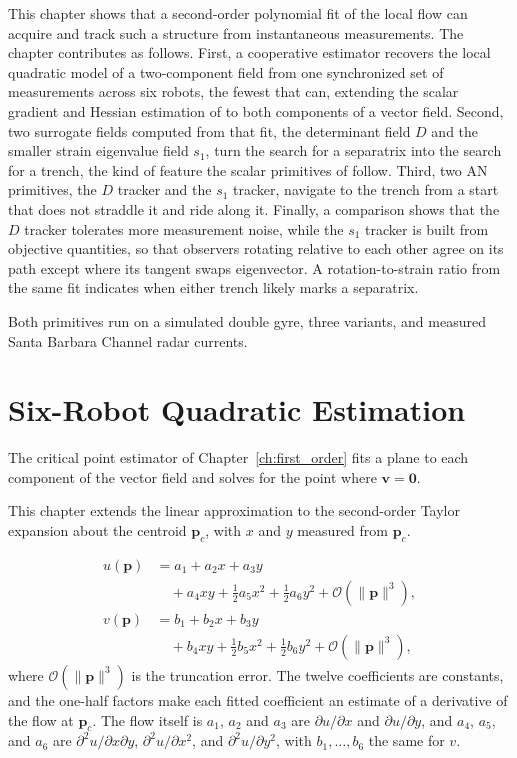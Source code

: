 This chapter shows that a second-order polynomial fit of the local flow can
acquire and track such a structure from instantaneous measurements. The
chapter contributes as follows.
First, a cooperative estimator recovers the local quadratic model of
a two-component field from one synchronized set of measurements across six
robots, the fewest that can, extending the scalar gradient and Hessian
estimation of \cite{15} to both components of a vector field. Second, two surrogate fields computed from that fit,
the determinant field $D$ and the smaller strain eigenvalue field $s_1$,
turn the search for a separatrix into the search for a trench, the kind of
feature the scalar primitives of \cite{3} follow. Third, two AN
primitives, the $D$ tracker and the $s_1$ tracker, navigate to the trench
from a start that does not straddle it and ride along it. Finally, a
comparison shows that the $D$ tracker tolerates more measurement noise,
while the $s_1$ tracker is built from objective quantities, so that
observers rotating relative to each other agree on its path except where
its tangent swaps eigenvector. A rotation-to-strain ratio from the same
fit indicates when either trench likely marks a separatrix.

Both primitives run on a simulated double gyre, three variants, and
measured Santa Barbara Channel radar currents.

\section{Six-Robot Quadratic Estimation}
\label{sec:ch7:estimation}

The critical point estimator of Chapter~\ref{ch:first_order} fits a plane to each
component of the vector field and solves for the point where $\mathbf{v} = \mathbf{0}$. 

This chapter extends the linear approximation to the second-order Taylor expansion about the
centroid $\mathbf{p}_c$, with $x$ and $y$ measured from $\mathbf{p}_c$.

\begin{align}
    u(\mathbf{p}) &= a_1 + a_2 x + a_3 y
        \nonumber \\
        &\quad + a_4 xy + \tfrac{1}{2} a_5 x^2 + \tfrac{1}{2} a_6 y^2
        + \mathcal{O}(\|\mathbf{p}\|^3),
        \label{eq:ch7:quad_model_u} \\
    v(\mathbf{p}) &= b_1 + b_2 x + b_3 y
        \nonumber \\
        &\quad + b_4 xy + \tfrac{1}{2} b_5 x^2 + \tfrac{1}{2} b_6 y^2
        + \mathcal{O}(\|\mathbf{p}\|^3),
        \label{eq:ch7:quad_model_v}
\end{align}
where $\mathcal{O}(\|\mathbf{p}\|^3)$ is the truncation error.
The twelve coefficients are constants, and the one-half factors make each
fitted coefficient an estimate of a derivative of the flow at $\mathbf{p}_c$. The flow itself is $a_1$,
$a_2$ and $a_3$ are $\partial u/\partial x$ and $\partial u/\partial y$,
and $a_4$, $a_5$, and $a_6$ are $\partial^2 u/\partial x\partial y$,
$\partial^2 u/\partial x^2$, and $\partial^2 u/\partial y^2$, with
$b_1, \ldots, b_6$ the same for $v$.

